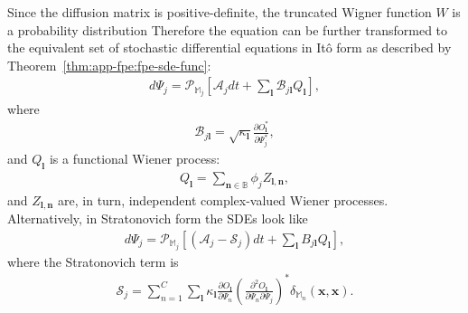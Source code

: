 \documentclass[12pt,aip,jmp,amssymb,amsmath]{revtex4-1}
\begin{document}
Since the diffusion matrix is positive-definite, the truncated Wigner function $W$ is a probability distribution
Therefore the equation can be further transformed to the equivalent set of stochastic differential equations in It\^{o} form as described by Theorem~\ref{thm:app-fpe:fpe-sde-func}:
\begin{equation}\begin{split}
\label{eqn:fpe:sdes}
    d\Psi_j = \mathcal{P}_{\mathbb{M}_j} \left[
        \mathcal{A}_j dt + \sum_{\boldsymbol{l}} \mathcal{B}_{j \boldsymbol{l}} Q_{\boldsymbol{l}}
    \right],
\end{split}\end{equation}
where
\begin{equation}\begin{split}
    \mathcal{B}_{j \boldsymbol{l}} = \sqrt{\kappa_{\boldsymbol{l}}} \frac{\partial O_{\boldsymbol{l}}^*}{\partial \Psi_j^*},
\end{split}\end{equation}
and $Q_{\boldsymbol{l}}$ is a functional Wiener process:
\begin{equation}\begin{split}
    Q_{\boldsymbol{l}} = \sum_{\boldsymbol{n} \in \mathbb{B}} \phi_j Z_{\boldsymbol{l},\boldsymbol{n}},
\end{split}\end{equation}
and $Z_{\boldsymbol{l},\boldsymbol{n}}$ are, in turn, independent complex-valued Wiener processes.
Alternatively, in Stratonovich form the SDEs look like
\begin{equation}\begin{split}
    d\Psi_j = \mathcal{P}_{\mathbb{M}_j} \left[
        (\mathcal{A}_j - \mathcal{S}_j) dt + \sum_{\boldsymbol{l}} B_{j \boldsymbol{l}} Q_{\boldsymbol{l}}
    \right],
\end{split}\end{equation}
where the Stratonovich term is
\begin{equation}\begin{split}
    \mathcal{S}_j
    = \sum_{n=1}^C \sum_{\boldsymbol{l}} \kappa_{\boldsymbol{l}}
        \frac{\partial O_{\boldsymbol{l}}}{\partial \Psi_n}
        \left(\frac{\partial^2 O_{\boldsymbol{l}}}{\partial \Psi_n \partial \Psi_j} \right)^*
        \delta_{\mathbb{M}_n} (\boldsymbol{x}, \boldsymbol{x}).
\end{split}\end{equation}
\end{document}
